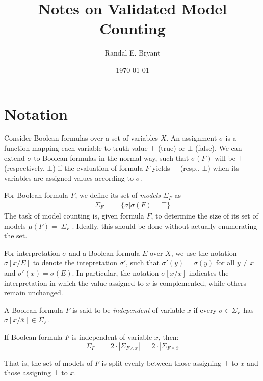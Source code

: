 \documentclass{llncs}
\title{Notes on Validated Model Counting}
\author{Randal E. Bryant}
\institute{
Computer Science Department \\
Carnegie Mellon University, Pittsburgh, PA, United States
}
\date{\today}
\newcommand{\tautology}{\top}
\newcommand{\nil}{\bot}
\newcommand{\obar}[1]{\overline{#1}}
\newcommand{\interp}{\sigma}
\newcommand{\interpset}[1]{\Sigma_{#1}}
\newcommand{\mcount}{\mu}
\newcommand{\subs}[2]{[#1/#2]}
\newcommand{\subsflip}[1]{\subs{#1}{\obar{#1}}}
\begin{document}
\maketitle

\section{Notation}

Consider Boolean formulas over a set of variables $X$.  An
assignment $\interp$ is a function mapping each variable to 
truth value $\tautology$ (true) or $\nil$ (false).  We can extend
$\interp$ to Boolean formulas in the normal way, such that
$\interp(F)$ will be $\tautology$ (respectively, $\nil$) if the
evaluation of formula $F$ yields $\tautology$ (resp., $\nil$) when its
variables are assigned values according to $\interp$.

For Boolean formula $F$, we define its set of {\em models} $\interpset{F}$ as
\begin{eqnarray}
\interpset{F} & = & \{ \interp | \interp(F) = \tautology \}
\end{eqnarray}
The task of model counting is, given formula $F$, to determine the size of its set of models
$\mcount(F) = |\interpset{F}|$.  Ideally, this should be done without actually enumerating the set.

For interpretation $\interp$ and a Boolean formula $E$ over $X$, we
use the notation $\interp\subs{x}{E}$ to denote the intepretation
$\interp'$, such that $\interp'(y) = \interp(y)$ for all $y \not = x$
and $\interp'(x) = \interp(E)$.  In particular, the notation
$\interp\subsflip{x}$ indicates the interpretation in which the value
assigned to $x$ is complemented, while others remain unchanged.

A Boolean formula $F$ is said to be {\em independent} of variable $x$
if every $\interp \in \interpset{F}$ has $\interp\subsflip{x} \in
\interpset{F}$.

\begin{lemma}
\label{lemma:independent:split}
If Boolean formula $F$ is independent of variable $x$, then:
\begin{equation}
|\interpset{F}| \; = \; 2\cdot |\interpset{F\land x}| = \; 2\cdot |\interpset{F\land \obar{x}}| \label{eqn:independent}
\end{equation}  
\end{lemma}  
That is, the set of models of $F$ is split evenly between
those assigning $\tautology$ to $x$ and those assigning $\nil$ to $x$.
\end{document}
